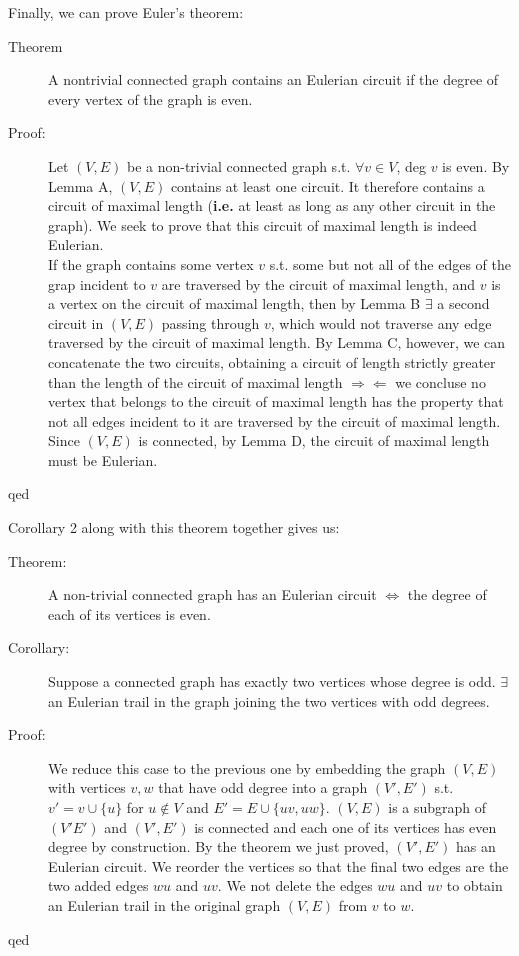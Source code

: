 \documentclass[10pt]{article}
\begin{document}
	Finally, we can prove Euler's theorem:
	\begin{description}
		\item[Theorem] A nontrivial connected graph contains an Eulerian circuit if the degree of every vertex of the graph is even.
		\item[Proof:] Let $(V, E)$ be a non-trivial connected graph s.t. $\forall v \in V$, deg $v$ is even. By Lemma A, $(V, E)$ contains at least one circuit. It therefore contains a circuit of maximal length (\textbf{i.e.} at least as long as any other circuit in the graph). We seek to prove that this circuit of maximal length is indeed Eulerian. \\
		If the graph contains some vertex $v$ s.t. some but not all of the edges of the grap incident to $v$ are traversed by the circuit of maximal length, and $v$ is a vertex on the circuit of maximal length, then by Lemma B $\exists$ a second circuit in $(V, E)$ passing through $v$, which would not traverse any edge traversed by the circuit of maximal length. By Lemma C, however, we can concatenate the two circuits, obtaining a circuit of length strictly greater than the length of the circuit of maximal length $\Rightarrow \Leftarrow$ we concluse no vertex that belongs to the circuit of maximal length has the property that not all edges incident to it are traversed by the circuit of maximal length. Since $(V, E)$ is connected, by Lemma D, the circuit of maximal length must be Eulerian.
		\item[qed]
	\end{description}
	Corollary 2 along with this theorem together gives us:
	\begin{description}
		\item[Theorem:] A non-trivial connected graph has an Eulerian circuit $\Leftrightarrow$ the degree of each of its vertices is even.
		\item[Corollary:] Suppose a connected graph has exactly two vertices whose degree is odd. $\exists$ an Eulerian trail in the graph joining the two vertices with odd degrees.
		\item[Proof:] We reduce this case to the previous one by embedding the graph $(V, E)$ with vertices $v, w$ that have odd degree into a graph $(V', E')$ s.t. $v' = v \cup \{u\}$ for $u \notin V$ and $E' = E \cup \{uv, uw\}$. $(V, E)$ is a subgraph of $(V' E')$ and $(V', E')$ is connected and each one of its vertices has even degree by construction. By the theorem we just proved, $(V', E')$ has an Eulerian circuit. We reorder the vertices so that the final two edges are the two added edges $wu$ and $uv$. We not delete the edges $wu$ and $uv$ to obtain an Eulerian trail in the original graph $(V, E)$ from $v$ to $w$.
		\item[qed]
	\end{description}
	
\end{document}

